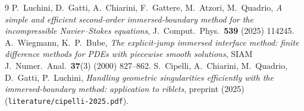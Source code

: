 \documentclass[11pt,a4paper]{article}
\newcommand{\code}[1]{\texttt{#1}}
\begin{document}
\begin{thebibliography}{9}
P.~Luchini, D.~Gatti, A.~Chiarini, F.~Gattere, M.~Atzori, M.~Quadrio,
\emph{A simple and efficient second-order immersed-boundary method for the
incompressible Navier--Stokes equations},
J.~Comput.\ Phys.\ \textbf{539} (2025) 114245.
A.~Wiegmann, K.~P.~Bube,
\emph{The explicit-jump immersed interface method: finite difference methods for
PDEs with piecewise smooth solutions},
SIAM J.~Numer.\ Anal.\ \textbf{37}(3) (2000) 827--862.
S.~Cipelli, A.~Chiarini, M.~Quadrio, D.~Gatti, P.~Luchini,
\emph{Handling geometric singularities efficiently with the immersed-boundary
method: application to riblets}, preprint (2025)
(\code{literature/cipelli-2025.pdf}).
\end{thebibliography}
\end{document}
